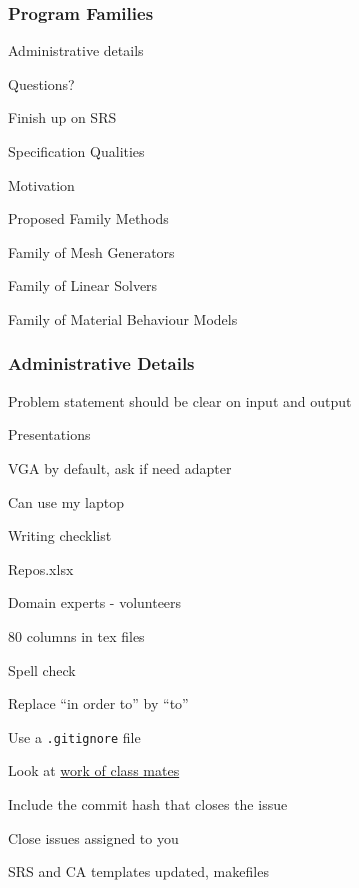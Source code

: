 \documentclass[t,12pt,numbers,fleqn]{beamer}
\newcounter{temp}
\begin{document}



\begin{frame}
\frametitle{Program Families}

\bi
\item Administrative details
\item Questions?
\item Finish up on SRS
\item Specification Qualities
\item Motivation
\item Proposed Family Methods
\item Family of Mesh Generators
\item Family of Linear Solvers
\item Family of Material Behaviour Models
\ei
\end{frame}


\begin{frame}
\frametitle{Administrative Details}

\bi
\item Problem statement should be clear on input and output
\item Presentations
\bi
\item VGA by default, ask if need adapter
\item Can use my laptop
\ei
\item Writing checklist
\item Repos.xlsx
\item Domain experts - volunteers
\item 80 columns in tex files
\item Spell check
\item Replace ``in order to'' by ``to''
\item Use a \texttt{.gitignore} file
\item Look at
  \href{https://gitlab.cas.mcmaster.ca/smiths/cas741/blob/master/Repos.xlsx}{work
    of class mates}
\item Include the commit hash that closes the issue
\item Close issues assigned to you
\item SRS and CA templates updated, makefiles
\ei

\end{frame}
\end{document}
